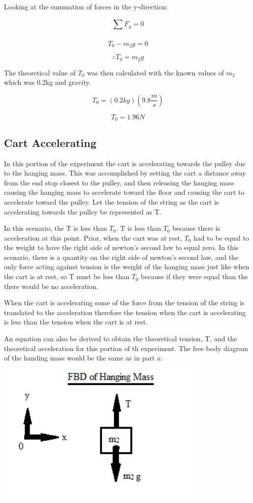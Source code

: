 \documentclass[aps,letterpaper,11pt]{revtex4}
\begin{document}
Looking at the summation of forces in the y-direction:

$$ \sum_{}^{} F_y = 0 $$

$$ T_0 - m_2g = 0$$

$$ \therefore T_0 = m_2g$$

The theoretical value of $T_0$ was then calculated with the known values of $m_2$ which was 0.2kg and gravity.

$$ T_0 = (0.2kg)(9.8\frac{m}{s})$$

$$ \boxed{T_0 = 1.96N}$$

\subsection{Cart Accelerating} 

In this portion of the experiment the cart is accelerating towards the pulley due to the hanging mass. This was accomplished by setting the cart a distance away from the end stop closest to the pulley, and then releasing the hanging mass causing the hanging mass to accelerate toward the floor and causing the cart to accelerate toward the pulley. Let the tension of the string as the cart is accelerating towards the pulley be represented as T.

In this scenario, the T is less than $T_0$. T is less than $T_0$ because there is acceleration at this point. Prior, when the cart was at rest, $T_0$ had to be equal to the weight to have the right side of newton's second law to equal zero. In this scenario, there is a quantity on the right side of newton's second law, and the only force acting against tension is the weight of the hanging mass just like when the cart is at rest, so T must be less than $T_0$ because if they were equal than the there would be no acceleration. 

When the cart is accelerating some of the force from the tension of the string is translated to the acceleration therefore the tension when the cart is accelerating is less than the tension when the cart is at rest.

An equation can also be derived to obtain the theoretical tension, T, and the theoretical acceleration for this portion of th experiment. The free body diagram of the handing mass would be the same as in part a:

\begin{center}
\includegraphics[width=4in]{FBDM2Accelerating.png}\\
\end{center} 
\end{document}

